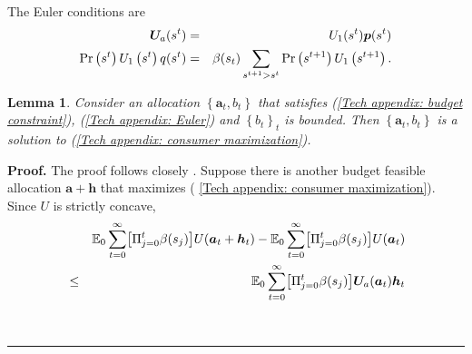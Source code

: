 \documentclass[thmsb,11pt]{article}
\newtheorem{lemma}{Lemma}
\newenvironment{proof}[1][Proof]{\noindent \textbf{#1.} }{\  \rule{0.5em}{0.5em}}
\begin{document}
\begin{appendix}
The Euler conditions are%
\begin{eqnarray}
\bm{U}_{a}(s^{t}) &=&U_{1}(s^{t})\bm{p}(s^{t})
\label{Tech appendix: Euler} \\
\Pr \left( s^{t}\right) U_{1}\left( s^{t}\right) q(s^{t}) &=&\beta(s_t)
\sum_{s^{t+1}>s^{t}}\Pr \left( s^{t+1}\right) U_{1}\left( s^{t+1}\right) .
\notag
\end{eqnarray}

\begin{lemma}
\smallskip Consider an allocation $\left \{ \bm{a}_{t},b_{t}\right \} $
that satisfies (\ref{Tech appendix: budget constraint}), (\ref{Tech
appendix: Euler}) and $\left \{ b_{t}\right \} _{t}$ is bounded. Then $%
\left
\{ \bm{a}_{t},b_{t}\right \} $ is a solution to (\ref{Tech
appendix: consumer maximization}).
\end{lemma}

\begin{proof}
The proof follows closely \cite{Constantinides1996}. Suppose there is
another budget feasible allocation $\bm{a}+\bm{h}$ that maximizes (%
\ref{Tech appendix: consumer maximization}). Since $U$ is strictly concave,
\begin{eqnarray}
&&\mathbb{E}_{0}\sum_{t=0}^{\infty }\bigl[\Pi_{j=0}^t \beta(s_j)\bigr]U(\bm{a}_{t}+\bm{h}%
_{t})-\mathbb{E}_{0}\sum_{t=0}^{\infty }\bigl[\Pi_{j=0}^t \beta(s_j)\bigr]U(\bm{a}_{t})
\label{Tech appendix: gain from h} \\
&\leq &\mathbb{E}_{0}\sum_{t=0}^{\infty }\bigl[\Pi_{j=0}^t \beta(s_j)\bigr]\bm{U}_{a}(\bm{a}%
_{t})\bm{h}_{t}  \notag
\end{eqnarray}


\end{proof}
\end{appendix}
\end{document}

